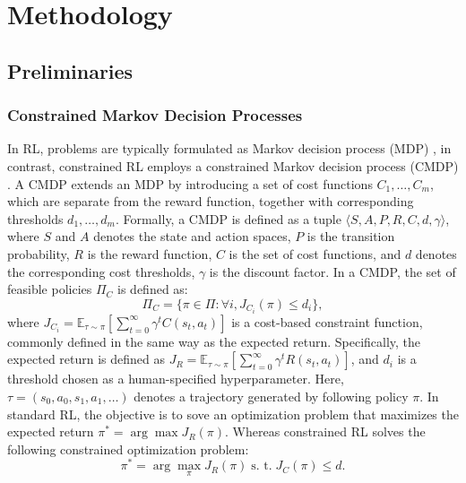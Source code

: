 \section{Methodology}

\subsection{Preliminaries}

\subsubsection{Constrained Markov Decision Processes}

In RL, problems are typically formulated as Markov decision process (MDP) \cite{sutton1998reinforcement}, in contrast, constrained RL employs a constrained Markov decision process (CMDP) \cite{altman2021constrained}.
A CMDP extends an MDP by introducing a set of cost functions $C_1, \ldots, C_m$, which are separate from the reward function, together with corresponding thresholds $d_1, \ldots, d_m$.
Formally, a CMDP is defined as a tuple $\langle S, A, P, R, C, d, \gamma \rangle$, where $S$ and $A$ denotes the state and action spaces, $P$ is the transition probability, $R$ is the reward function, $C$ is the set of cost functions, and $d$ denotes the corresponding cost thresholds, $\gamma$ is the discount factor.
In a CMDP, the set of feasible policies $\Pi_C$ is defined as:
\begin{equation} \label{eq:feasible_policy_set_cmdp}
    \Pi_C = \{ \pi \in \Pi: \forall i, J_{C_i}(\pi) \leq d_i \},
\end{equation}
where $J_{C_i} = \mathbb{E}_{\tau \sim \pi}[\sum^\infty_{t = 0} \gamma^t C(s_t, a_t)]$ is a cost-based constraint function, commonly defined in the same way as the expected return.
Specifically, the expected return is defined as $J_R = \mathbb{E}_{\tau \sim \pi}[\sum^\infty_{t = 0} \gamma^t R(s_t, a_t)]$, and $d_i$ is a threshold chosen as a human-specified hyperparameter.
Here, $\tau = (s_0, a_0, s_1, a_1, \ldots)$ denotes a trajectory generated by following policy $\pi$.
In standard RL, the objective is to sove an optimization problem that maximizes the expected return $\pi^* = \arg \max J_R(\pi)$.
Whereas constrained RL solves the following constrained optimization problem:
\begin{equation} \label{eq:cmdp_optimization_problem}
    \pi^* = \arg\max_\pi J_R(\pi) \; \text{s. t.} \; J_C(\pi) \leq d.
\end{equation}

